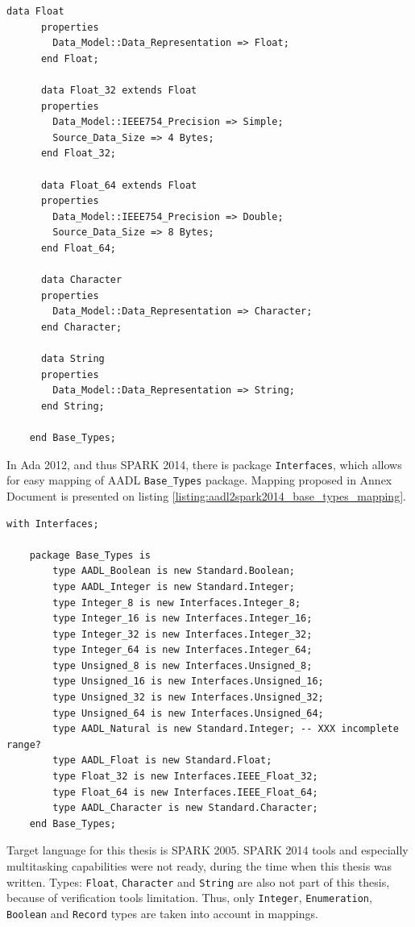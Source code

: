 \begin{lstlisting}[language=aadl, frame=single, gobble=0, caption={AADL Base\_Types package}, label={listing:aadl_base_types}]
	  data Float 
	  properties
	    Data_Model::Data_Representation => Float;
	  end Float;

	  data Float_32 extends Float 
	  properties 
	    Data_Model::IEEE754_Precision => Simple; 
	    Source_Data_Size => 4 Bytes; 
	  end Float_32; 

	  data Float_64 extends Float 
	  properties 
	    Data_Model::IEEE754_Precision => Double; 
	    Source_Data_Size => 8 Bytes; 
	  end Float_64;

	  data Character
	  properties
	    Data_Model::Data_Representation => Character;
	  end Character;

	  data String
	  properties
	    Data_Model::Data_Representation => String;
	  end String;

	end Base_Types;
\end{lstlisting} 
\doublespacing

In Ada 2012, and thus SPARK 2014, there is package \lstinline{Interfaces}, which allows for easy mapping of AADL \lstinline{Base_Types} package. Mapping proposed in Annex Document \cite{AnnexDoc} is presented on listing \ref{listing:aadl2spark2014_base_types_mapping}.

\singlespacing
\begin{lstlisting}[language=aadl, frame=single, gobble=0, caption={Mapping of Base\_Types for SPARK 2014}, label={listing:aadl2spark2014_base_types_mapping}]
	with Interfaces;

	package Base_Types is
		type AADL_Boolean is new Standard.Boolean;
		type AADL_Integer is new Standard.Integer;
	 	type Integer_8 is new Interfaces.Integer_8;
	 	type Integer_16 is new Interfaces.Integer_16;
		type Integer_32 is new Interfaces.Integer_32;
		type Integer_64 is new Interfaces.Integer_64;
		type Unsigned_8 is new Interfaces.Unsigned_8;
		type Unsigned_16 is new Interfaces.Unsigned_16;
		type Unsigned_32 is new Interfaces.Unsigned_32;
		type Unsigned_64 is new Interfaces.Unsigned_64;
		type AADL_Natural is new Standard.Integer; -- XXX incomplete range? 
		type AADL_Float is new Standard.Float;
		type Float_32 is new Interfaces.IEEE_Float_32;
		type Float_64 is new Interfaces.IEEE_Float_64;
	  	type AADL_Character is new Standard.Character;
	end Base_Types;
\end{lstlisting} 
\doublespacing

Target language for this thesis is SPARK 2005. SPARK 2014 tools and especially multitasking capabilities were not ready, during the time when this thesis was written. Types: \lstinline{Float}, \lstinline{Character} and \lstinline{String} are also not part of this thesis, because of verification tools limitation. Thus, only \lstinline{Integer}, \lstinline{Enumeration}, \lstinline{Boolean} and \lstinline{Record} types are taken into account in mappings.

